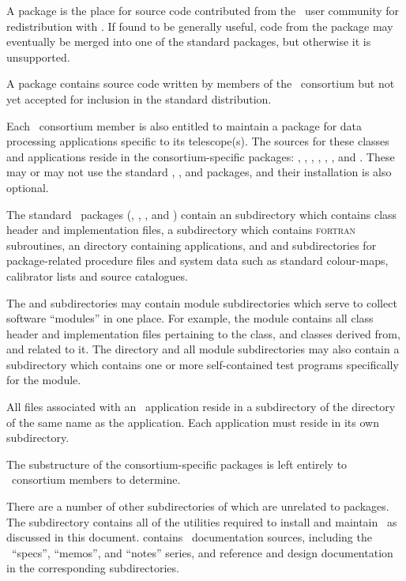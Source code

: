 A  package is the place for source code contributed from the
\aipspp\ user community for redistribution with \aipspp.  If found to be
generally useful, code from the  package may eventually be
merged into one of the standard packages, but otherwise it is unsupported.

A  package contains source code written by members of the
\aipspp\ consortium but not yet accepted for inclusion in the standard
distribution.

Each \aipspp\ consortium member is also entitled to maintain a package for
data processing applications specific to its telescope(s).  The sources for
these classes and applications reside in the consortium-specific packages:
, , , , , ,
and .  These may or may not use the standard ,
, and  packages, and their installation is also
optional.

The standard \aipspp\ packages (, , ,
and ) contain an  subdirectory which contains class
header and implementation files, a  subdirectory which contains
\textsc{fortran} subroutines, an  directory containing applications,
and  and  subdirectories for package-related
procedure files and system data such as standard colour-maps, calibrator lists
and source catalogues.

The  and  subdirectories may contain module
subdirectories which serve to collect software ``modules'' in one place.  For
example, the  module contains all class header and implementation
files pertaining to the  class, and classes derived from, and
related to it.  The  directory and all module subdirectories
may also contain a  subdirectory which contains one or more
self-contained test programs specifically for the module.

All files associated with an \aipspp\ application reside in a subdirectory of
the  directory of the same name as the application.  Each
application must reside in its own subdirectory.

The substructure of the consortium-specific packages is left entirely to
\aipspp\ consortium members to determine.

There are a number of other subdirectories of  which are
unrelated to packages.  The  subdirectory contains all of the
utilities required to install and maintain \aipspp\ as discussed in this
document.   contains \aipspp\ documentation sources, including the
\aipspp\ ``specs'', ``memos'', and ``notes'' series, and reference and design
documentation in the corresponding subdirectories.

